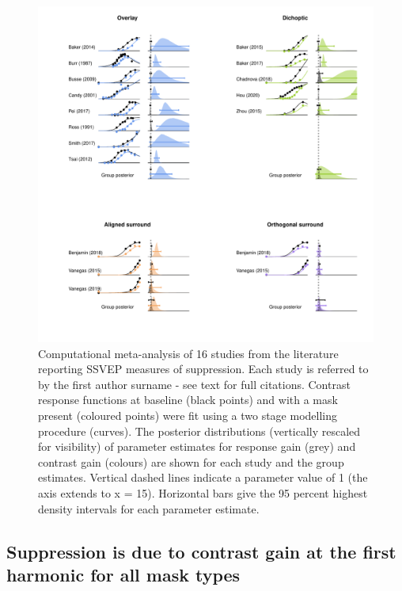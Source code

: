 \documentclass[]{article}
\begin{document}
\begin{figure}

{\centering \includegraphics{figures/metaanalysis} 

}

\caption{Computational meta-analysis of 16 studies from the literature reporting SSVEP measures of suppression. Each study is referred to by the first author surname - see text for full citations. Contrast response functions at baseline (black points) and with a mask present (coloured points) were fit using a two stage modelling procedure (curves). The posterior distributions (vertically rescaled for visibility) of parameter estimates for response gain (grey) and contrast gain (colours) are shown for each study and the group estimates. Vertical dashed lines indicate a parameter value of 1 (the axis extends to x = 15). Horizontal bars give the 95 percent highest density intervals for each parameter estimate.}\label{fig:metaanalysis}
\end{figure}

\hypertarget{suppression-is-due-to-contrast-gain-at-the-first-harmonic-for-all-mask-types}{%
\subsection{Suppression is due to contrast gain at the first harmonic for all mask types}\label{suppression-is-due-to-contrast-gain-at-the-first-harmonic-for-all-mask-types}}
\end{document}
